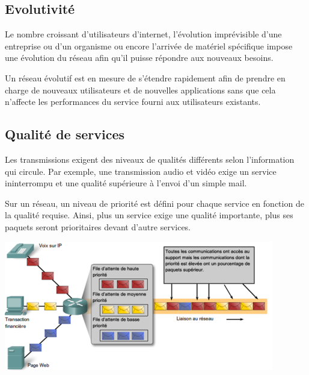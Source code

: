 \documentclass[10pt,fleqn]{article} %
\begin{document}
\subsection{Evolutivité}
Le nombre croissant d'utilisateurs d'internet, l'évolution imprévisible d'une entreprise ou d'un organisme ou encore l'arrivée de matériel spécifique impose une évolution du réseau afin qu'il puisse répondre aux nouveaux besoins.
\begin{definition}
  Un réseau évolutif est en mesure de s'étendre rapidement afin de prendre en charge de nouveaux utilisateurs et de nouvelles applications sans que cela n'affecte les performances du service fourni aux utilisateurs existants.
\end{definition}

\subsection{Qualité de services}
Les transmissions exigent des niveaux de qualités différents selon l'information qui circule. Par exemple, une transmission audio et vidéo exige un service ininterrompu et une qualité supérieure à l'envoi d'un simple mail.
\begin{aretenir}
  Sur un réseau, un niveau de priorité est défini pour chaque service en fonction de la qualité requise. Ainsi, plus un service exige une qualité importante, plus ses paquets seront prioritaires devant d'autre services.
  \begin{center}
    \includegraphics[width=.8\textwidth]{img/reseau_priorites}
  \end{center}
\end{aretenir}
\end{document}
